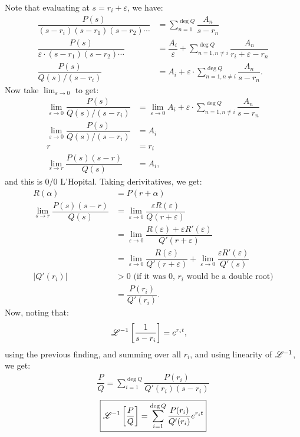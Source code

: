 \documentclass[11pt]{article}
\begin{document}
    \begin{solution}
        Note that evaluating at $s=r_i + \varepsilon$, we have:
        \begin{align}
            \dfrac{P(s)}{(s-r_i)(s-r_1)(s-r_2) \cdots } &= \sum_{n=1}^{\deg Q} \dfrac{A_n}{s-r_n} \\
            \dfrac{P(s)}{\varepsilon \cdot (s-r_1)(s-r_2) \cdots } &= \dfrac{A_i}{\varepsilon} + \sum_{n=1, n \ne i}^{\deg Q} \dfrac{A_n}{r_i+\varepsilon-r_n} \\
            \dfrac{P(s)}{Q(s)/(s - r_i)} &= A_i + \varepsilon \cdot \sum_{n=1, n \ne i}^{\deg Q} \dfrac{A_n}{s-r_n}.
        \end{align}
        Now take $\displaystyle \lim_{\varepsilon \rightarrow 0}$ to get:
        \begin{align}
            \lim_{\varepsilon \rightarrow 0} \dfrac{P(s)}{Q(s)/(s - r_i)} &= \lim_{\varepsilon \rightarrow 0} A_i + \varepsilon \cdot \sum_{n=1, n \ne i}^{\deg Q} \dfrac{A_n}{s-r_n} \\
            \lim_{\varepsilon \rightarrow 0} \dfrac{P(s)}{Q(s)/(s - r_i)} &= A_i  \\
            r &= r_i \\
            \lim_{s \rightarrow r} \dfrac{P(s)(s-r)}{Q(s)} &= A_i,
        \end{align}
        and this is $0/0$ L'Hopital. Taking derivitatives, we get:
        \begin{align}
            R(\alpha) &= P(r+\alpha) \\
            \lim_{s \rightarrow r} \dfrac{P(s)(s-r)}{Q(s)} &= \lim_{\varepsilon \rightarrow 0} \dfrac{\varepsilon R(\varepsilon)}{Q(r+\varepsilon)} \\
            &= \lim_{\varepsilon \rightarrow 0} \dfrac{R(\varepsilon) + \varepsilon R'(\varepsilon)}{Q'(r+\varepsilon)} \\
            &= \lim_{\varepsilon \rightarrow 0} \dfrac{R(\varepsilon)}{Q'(r+\varepsilon)}  +  \lim_{\varepsilon \rightarrow 0} \dfrac{\varepsilon R'(\varepsilon)}{Q'(s)}  \\
            |Q'(r_i)| &> 0 \text{ (if it was 0, }r_i\text{ would be a double root)} \\
            &= \dfrac{P(r_i)}{Q'(r_i)}.
        \end{align}
        Now, noting that:
        \begin{align}
            \mathscr L^{-1}\left[\dfrac{1}{s-r_i}\right] &= e^{r_it},
        \end{align}
        using the previous finding, and summing over all $r_i$, and using linearity of $\mathscr L^{-1}$, we get:
        \begin{align}
            \boxed{\dfrac{P}{Q} = \sum_{i=1}^{\deg Q} \dfrac{P(r_i)}{Q'(r_i)(s-r_i)}}
        \end{align}
        \begin{align}
            \boxed{\mathscr L^{-1} \left[\dfrac{P}{Q}\right] = \sum_{i=1}^{\deg Q} \dfrac{P(r_i)}{Q'(r_i)}e^{r_it}}
        \end{align}
    \end{solution}
\end{document}
